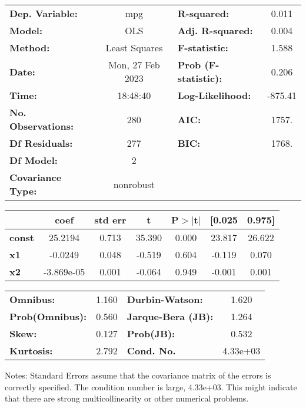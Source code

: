 \begin{center}
\begin{tabular}{lclc}
\toprule
\textbf{Dep. Variable:}    &       mpg        & \textbf{  R-squared:         } &     0.011   \\
\textbf{Model:}            &       OLS        & \textbf{  Adj. R-squared:    } &     0.004   \\
\textbf{Method:}           &  Least Squares   & \textbf{  F-statistic:       } &     1.588   \\
\textbf{Date:}             & Mon, 27 Feb 2023 & \textbf{  Prob (F-statistic):} &    0.206    \\
\textbf{Time:}             &     18:48:40     & \textbf{  Log-Likelihood:    } &   -875.41   \\
\textbf{No. Observations:} &         280      & \textbf{  AIC:               } &     1757.   \\
\textbf{Df Residuals:}     &         277      & \textbf{  BIC:               } &     1768.   \\
\textbf{Df Model:}         &           2      & \textbf{                     } &             \\
\textbf{Covariance Type:}  &    nonrobust     & \textbf{                     } &             \\
\bottomrule
\end{tabular}
\begin{tabular}{lcccccc}
               & \textbf{coef} & \textbf{std err} & \textbf{t} & \textbf{P$> |$t$|$} & \textbf{[0.025} & \textbf{0.975]}  \\
\midrule
\textbf{const} &      25.2194  &        0.713     &    35.390  &         0.000        &       23.817    &       26.622     \\
\textbf{x1}    &      -0.0249  &        0.048     &    -0.519  &         0.604        &       -0.119    &        0.070     \\
\textbf{x2}    &   -3.869e-05  &        0.001     &    -0.064  &         0.949        &       -0.001    &        0.001     \\
\bottomrule
\end{tabular}
\begin{tabular}{lclc}
\textbf{Omnibus:}       &  1.160 & \textbf{  Durbin-Watson:     } &    1.620  \\
\textbf{Prob(Omnibus):} &  0.560 & \textbf{  Jarque-Bera (JB):  } &    1.264  \\
\textbf{Skew:}          &  0.127 & \textbf{  Prob(JB):          } &    0.532  \\
\textbf{Kurtosis:}      &  2.792 & \textbf{  Cond. No.          } & 4.33e+03  \\
\bottomrule
\end{tabular}
\end{center}

Notes: \newline
 [1] Standard Errors assume that the covariance matrix of the errors is correctly specified. \newline
 [2] The condition number is large, 4.33e+03. This might indicate that there are \newline
 strong multicollinearity or other numerical problems.
